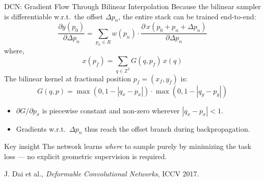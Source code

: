 \documentclass[aspectratio=169,10pt]{beamer}
\begin{document}
\begin{frame}{DCN: Gradient Flow Through Bilinear Interpolation}
\small
Because the bilinear sampler is differentiable w.r.t.\ the offset $\Delta p_n$, the entire stack can be trained end-to-end:
\[
\frac{\partial y(p_0)}{\partial \Delta p_n}
  = \sum_{p_n \in R} w(p_n) \cdot
    \frac{\partial\, x\!\left(p_0 + p_n + \Delta p_n\right)}{\partial \Delta p_n}
\]
where, \[
x(p_f) = \sum_{q \in \mathbb{Z}^2}
          G(q, p_f)\, x(q)
\]
The bilinear kernel at fractional position $p_f = (x_f, y_f)$ is:
\[
G(q,p) = \max\!\left(0,1-|q_x-p_x|\right)\cdot
          \max\!\left(0,1-|q_y-p_y|\right)
\]
\begin{itemize}
  \item $\partial G / \partial p_x$ is piecewise constant and non-zero wherever $|q_x - p_x| < 1$.
  \item Gradients w.r.t.\ $\Delta p_n$ thus reach the offset branch during backpropagation.
\end{itemize}
\begin{alertblock}{Key insight}
The network learns \emph{where} to sample purely by minimizing the task loss — no explicit geometric supervision is required.
\end{alertblock}
\vfill
{\tiny J. Dai et al., \textit{Deformable Convolutional Networks}, ICCV 2017.}
\end{frame}
\end{document}
